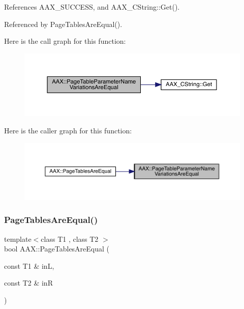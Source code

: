 References A\+A\+X\+\_\+\+S\+U\+C\+C\+E\+SS, and A\+A\+X\+\_\+\+C\+String\+::\+Get().



Referenced by Page\+Tables\+Are\+Equal().

Here is the call graph for this function\+:
\nopagebreak
\begin{figure}[H]
\begin{center}
\leavevmode
\includegraphics[width=350pt]{a00852_a2e75756c486e5db4ffa91579bb486a6a_cgraph}
\end{center}
\end{figure}
Here is the caller graph for this function\+:
\nopagebreak
\begin{figure}[H]
\begin{center}
\leavevmode
\includegraphics[width=350pt]{a00852_a2e75756c486e5db4ffa91579bb486a6a_icgraph}
\end{center}
\end{figure}
\mbox{\label{a00852_a315085bafc0ddf4e7043a69d070da2fb}} 
\subsubsection{\texorpdfstring{PageTablesAreEqual()}{PageTablesAreEqual()}}
{\footnotesize\ttfamily template$<$class T1 , class T2 $>$ \\
bool A\+A\+X\+::\+Page\+Tables\+Are\+Equal (\begin{DoxyParamCaption}\item[{const T1 \&}]{inL,  }\item[{const T2 \&}]{inR }\end{DoxyParamCaption})\hspace{0.3cm}{\ttfamily [inline]}}



